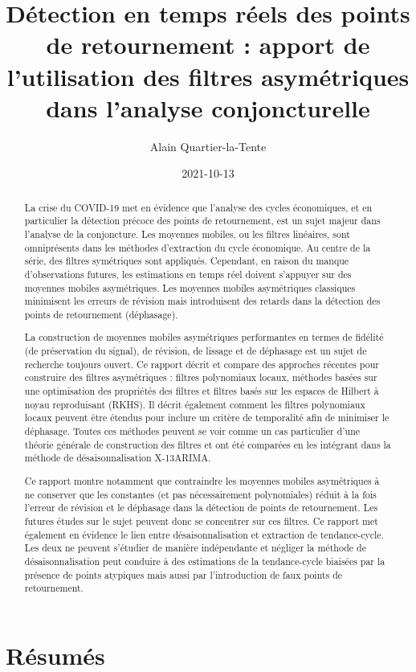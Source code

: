 \documentclass[
  11pt,
  french,
  a4paper]{article}
\title{Détection en temps réels des points de retournement : apport de l'utilisation des filtres asymétriques dans l'analyse conjoncturelle}
\author{Alain Quartier-la-Tente}
\date{2021-10-13}
\newcommand\1{\mathds{1}}
\begin{document}
\maketitle

{
\hypersetup{linkcolor=}
\setcounter{tocdepth}{3}
\tableofcontents
}
\newpage{}

\hypertarget{ruxe9sumuxe9s}{%
\section*{Résumés}\label{ruxe9sumuxe9s}}

\begin{abstract}
La crise du COVID-19 met en évidence que l'analyse des cycles économiques, et en particulier la détection précoce des points de retournement, est un sujet majeur dans l'analyse de la conjoncture.
Les moyennes mobiles, ou les filtres linéaires, sont omniprésents dans les méthodes d'extraction du cycle économique.
Au centre de la série, des filtres symétriques sont appliqués.
Cependant, en raison du manque d'observations futures, les estimations en temps réel doivent s'appuyer sur des moyennes mobiles asymétriques.
Les moyennes mobiles asymétriques classiques minimisent les erreurs de révision mais introduisent des retards dans la détection des points de retournement (déphasage).

La construction de moyennes mobiles asymétriques performantes en termes de fidélité (de préservation du signal), de révision, de lissage et de déphasage est un sujet de recherche toujours ouvert.
Ce rapport décrit et compare des approches récentes pour construire des filtres asymétriques : filtres polynomiaux locaux, méthodes basées sur une optimisation des propriétés des filtres et filtres basés sur les espaces de Hilbert à noyau reproduisant (RKHS).
Il décrit également comment les filtres polynomiaux locaux peuvent être étendus pour inclure un critère de temporalité afin de minimiser le déphasage.
Toutes ces méthodes peuvent se voir comme un cas particulier d'une théorie générale de construction des filtres et ont été comparées en les intégrant dans la méthode de désaisonnalisation X-13ARIMA.

Ce rapport montre notamment que contraindre les moyennes mobiles asymétriques à ne conserver que les constantes (et pas nécessairement polynomiales) réduit à la fois l'erreur de révision et le déphasage dans la détection de points de retournement.
Les futures études sur le sujet peuvent donc se concentrer sur ces filtres.
Ce rapport met également en évidence le lien entre désaisonnalisation et extraction de tendance-cycle.
Les deux ne peuvent s'étudier de manière indépendante et négliger la méthode de désaisonnalisation peut conduire à des estimations de la tendance-cycle biaisées par la présence de points atypiques mais aussi par l'introduction de faux points de retournement.


\end{abstract}
\end{document}
